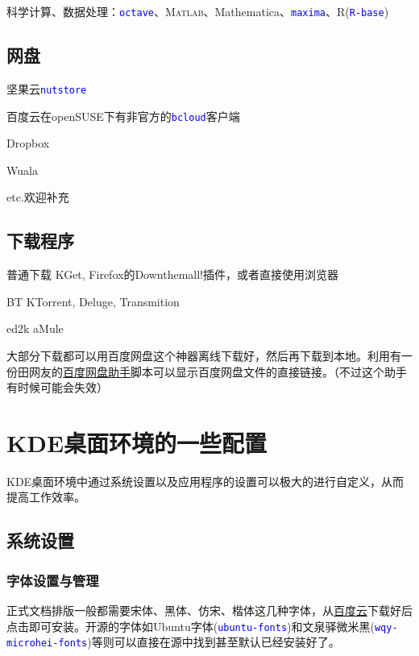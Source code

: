 \documentclass[12pt,openany]{book}
\newcommand{\soft}[1]{\texttt{\textcolor{blue}{#1}}}
\begin{document}
科学计算、数据处理：\soft{octave}、\textsc{Matlab}、Mathematica、\soft{maxima}、R(\soft{R-base})
\section{网盘}
\begin{compactitem}
 \item 坚果云\soft{nutstore}
 \item 百度云在openSUSE下有非官方的\soft{bcloud}客户端
 \item Dropbox
 \item Wuala
 \item etc.欢迎补充
\end{compactitem}
\section{下载程序}
\begin{compactdesc}
 \item[普通下载] KGet, Firefox的Down\-them\-all!插件，或者直接使用浏览器
 \item[BT] KTorrent, Deluge, Transmition
 \item[ed2k] aMule
\end{compactdesc}

大部分下载都可以用百度网盘这个神器离线下载好，然后再下载到本地。利用有一份田网友的\href{http://git.oschina.net/youyifentian/dupanlink}{百度网盘助手}脚本可以显示百度网盘文件的直接链接。（不过这个助手有时候可能会失效）
\chapter{KDE桌面环境的一些配置}
KDE桌面环境中通过系统设置以及应用程序的设置可以极大的进行自定义，从而提高工作效率。
\section{系统设置}
\subsection{字体设置与管理}
正式文档排版一般都需要宋体、黑体、仿宋、楷体这几种字体，从\href{http://pan.baidu.com/s/1mgiHWmO}{百度云}下载好后点击即可安装。开源的字体如Ubuntu字体(\soft{ubuntu-fonts})和文泉驿微米黑(\soft{wqy-microhei-fonts})等则可以直接在源中找到甚至默认已经安装好了。
\end{document}

